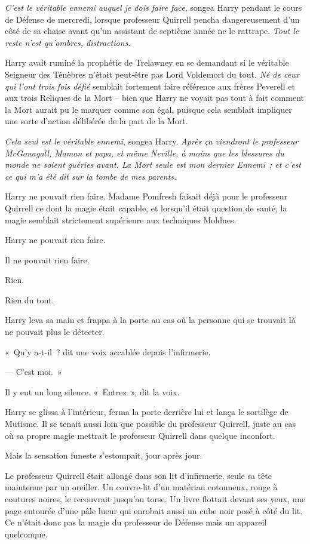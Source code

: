\emph{C'est le véritable ennemi auquel je dois faire face}, songea Harry pendant le cours de Défense de mercredi, lorsque professeur Quirrell pencha dangereusement d'un côté de sa chaise avant qu'un assistant de septième année ne le rattrape.
\emph{Tout le reste n'est qu'ombres, distractions.}

Harry avait ruminé la prophétie de Trelawney en se demandant si le véritable Seigneur des Ténèbres n'était peut-être pas Lord Voldemort du tout.
\emph{Né de ceux qui l'ont trois fois défié} semblait fortement faire référence aux frères Peverell et aux trois Reliques de la Mort -- bien que Harry ne voyait pas tout à fait comment la Mort aurait pu le marquer comme son égal, puisque cela semblait impliquer une sorte d'action délibérée de la part de la Mort.

\emph{Cela seul est le véritable ennemi}, songea Harry.
\emph{Après ça viendront le professeur McGonagall, Maman et papa, et même Neville, à moins que les blessures du monde ne soient guéries avant.
La Mort seule est mon dernier Ennemi~; et c'est ce qui m'a été dit sur la tombe de mes parents.}

Harry ne pouvait rien faire.
Madame Pomfresh faisait déjà pour le professeur Quirrell ce dont la magie était capable, et lorsqu'il était question de santé, la magie semblait strictement supérieure aux techniques Moldues.

Harry ne pouvait rien faire.

Il ne pouvait rien faire.

Rien.

Rien du tout.

\later

Harry leva sa main et frappa à la porte au cas où la personne qui se trouvait là ne pouvait plus le détecter.

«~Qu'y a-t-il~? dit une voix accablée depuis l'infirmerie.

--- C'est moi.~»

Il y eut un long silence.
«~Entrez~», dit la voix.

Harry se glissa à l'intérieur, ferma la porte derrière lui et lança le sortilège de Mutisme.
Il se tenait aussi loin que possible du professeur Quirrell, juste au cas où sa propre magie mettrait le professeur Quirrell dans quelque inconfort.

Mais la sensation funeste s'estompait, jour après jour.

Le professeur Quirrell était allongé dans son lit d'infirmerie, seule sa tête maintenue par un oreiller.
Un couvre-lit d'un matériau cotonneux, rouge à coutures noires, le recouvrait jusqu'au torse.
Un livre flottait devant ses yeux, une page entourée d'une pâle lueur qui enrobait aussi un cube noir posé à côté du lit.
Ce n'était donc pas la magie du professeur de Défense mais un appareil quelconque.


